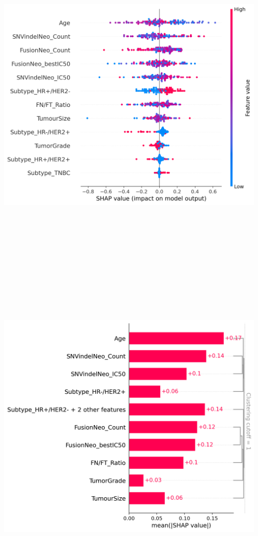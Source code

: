\documentclass[
  letterpaper,
  DIV=11,
  numbers=noendperiod]{scrartcl}
\begin{document}
\includegraphics[width=8.04167in,height=6.4375in]{xgboost_tuned_files/figure-pdf/cell-41-output-4.png}

\includegraphics[width=7.88542in,height=6.65625in]{xgboost_tuned_files/figure-pdf/cell-41-output-5.png}
\end{document}
